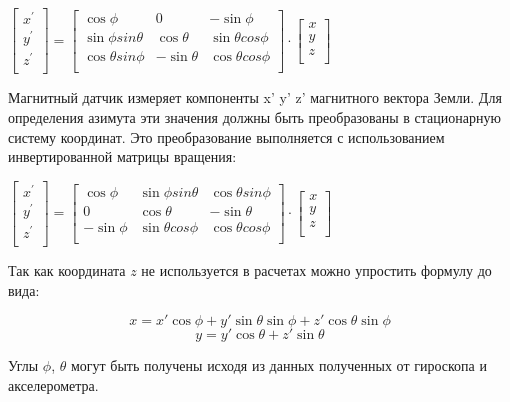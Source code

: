 $ \begin{bmatrix} x^' \\ y^' \\ z^' \\ \end{bmatrix} = 
\begin{bmatrix} \cos{\phi} & 0 & -\sin{\phi} \\ 
    \sin{\phi}sin{\theta} & \cos{\theta} & \sin{\theta}cos{\phi} \\ 
    \cos{\theta}sin{\phi} & -\sin{\theta} & \cos{\theta}cos{\phi} \\ 
\end{bmatrix}
\cdot
\begin{bmatrix} x \\ y \\ z \\ \end{bmatrix} $

Магнитный датчик измеряет компоненты x' y' z' магнитного вектора Земли. 
Для определения азимута эти значения должны быть преобразованы в стационарную систему координат.
Это преобразование выполняется с использованием инвертированной матрицы вращения:

$ \begin{bmatrix} x^' \\ y^' \\ z^' \\ \end{bmatrix} = 
\begin{bmatrix} \cos{\phi} & \sin{\phi}sin{\theta} & \cos{\theta}sin{\phi} \\ 
                0 & \cos{\theta} & -\sin{\theta} \\ 
                -\sin{\phi} & \sin{\theta}cos{\phi}& \cos{\theta}cos{\phi} \\ 
\end{bmatrix}
\cdot
\begin{bmatrix} x \\ y \\ z \\ \end{bmatrix} $

Так как координата $z$ не используется в расчетах можно упростить формулу до вида:

$$ x = x'\cos{\phi}+y'\sin{\theta}\sin{\phi}+z'\cos{\theta}\sin{\phi}$$
$$ y = y'\cos{\theta}+z'\sin{\theta}$$

Углы $\phi$, $\theta$ могут быть получены исходя из данных полученных от гироскопа и акселерометра.

